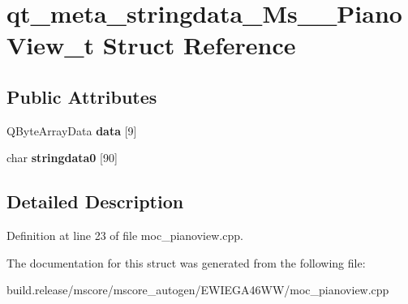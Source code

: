 \hypertarget{structqt__meta__stringdata___ms_____piano_view__t}{}\section{qt\+\_\+meta\+\_\+stringdata\+\_\+\+Ms\+\_\+\+\_\+\+Piano\+View\+\_\+t Struct Reference}
\label{structqt__meta__stringdata___ms_____piano_view__t}
\subsection*{Public Attributes}
\begin{DoxyCompactItemize}
\item 
\mbox{\label{structqt__meta__stringdata___ms_____piano_view__t_aed39d9c7dd2bd3425bd3420ecca5dd64}} 
Q\+Byte\+Array\+Data {\bfseries data} \mbox{[}9\mbox{]}
\item 
\mbox{\label{structqt__meta__stringdata___ms_____piano_view__t_a117b40fa0c74ee108c0c7b1bedac306f}} 
char {\bfseries stringdata0} \mbox{[}90\mbox{]}
\end{DoxyCompactItemize}


\subsection{Detailed Description}


Definition at line 23 of file moc\+\_\+pianoview.\+cpp.



The documentation for this struct was generated from the following file\+:\begin{DoxyCompactItemize}
\item 
build.\+release/mscore/mscore\+\_\+autogen/\+E\+W\+I\+E\+G\+A46\+W\+W/moc\+\_\+pianoview.\+cpp\end{DoxyCompactItemize}
